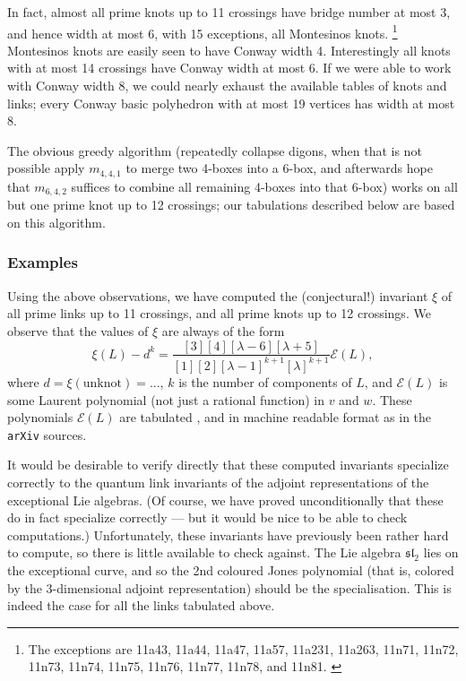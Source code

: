 \documentclass[12pt]{amsart}
\begin{document}
In fact, almost all prime knots up to 11 crossings have bridge number 
at most 3, and hence width at most 6, with 15 exceptions, all Montesinos
knots. \footnote{The exceptions are 11a43, 11a44, 11a47, 11a57, 11a231,
  11a263, 11n71, 11n72, 11n73, 11n74, 11n75, 11n76, 11n77, 11n78, and
  11n81. \cite{1208.4233}}
Montesinos knots are easily seen to have Conway width 4.
Interestingly all knots with at most 14 crossings have Conway width at most 6.
If we were able to work with Conway width 8, we could nearly exhaust the 
available tables of knots and links; every Conway basic polyhedron with at 
most 19 vertices has width at most 8.

The obvious greedy algorithm (repeatedly collapse digons, when that is not
possible apply $m_{4,4,1}$ to merge two 4-boxes into a 6-box, and afterwards
hope that $m_{6,4,2}$  suffices to combine all remaining 4-boxes into that
6-box) works on all but one prime knot up to 12 crossings; our tabulations
described below are based on this algorithm.

\subsubsection{Examples}
Using the above observations, we have computed the (conjectural!) 
invariant $\xi$ of all prime links up to 11 crossings, and all prime knots up
to 12 crossings. We observe that the values of $\xi$ are always of the form
$$\xi(L) - d^{k} = 
\frac{[3][4][\lambda-6][\lambda+5]}{[1][2][\lambda-1]^{k+1} [\lambda]^{k+1}} \mathcal E(L),$$
where $d = \xi(\textrm{unknot}) = ...$, $k$ is the number of components of $L$, 
and $\mathcal E(L)$ is some Laurent polynomial (not just a rational function)
in $v$ and $w$. These polynomials $\mathcal E (L)$ are tabulated
, and in machine readable format as  in the {\tt arXiv} sources.

It would be desirable to verify directly that these computed invariants specialize 
correctly to the quantum link invariants of the adjoint representations of the
exceptional Lie algebras. (Of course, we have proved unconditionally  that these do in fact
specialize correctly --- but it would be nice to be able to check computations.)
Unfortunately, these invariants have previously been
rather hard to compute, so there is little available to check against. The Lie
algebra $\mathfrak{sl}_2$ lies on the exceptional curve, and so the 2nd
coloured Jones polynomial  (that is, colored by the 3-dimensional adjoint
representation) should be the  specialisation. This is
indeed the case for all the links tabulated above.
\end{document}
